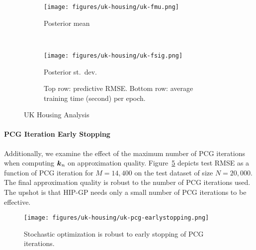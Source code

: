 \begin{figure}
\centering
\begin{subfigure}{.48\columnwidth}
  \texttt{[image: figures/uk-housing/uk-fmu.png]}
  \caption{Posterior mean}
	\label{fig:housing-mu}
\end{subfigure}
~
\begin{subfigure}{.48\columnwidth}
  \texttt{[image: figures/uk-housing/uk-fsig.png]}
  \caption{Posterior st.~dev.}
  \label{fig:housing-sig}
\end{subfigure}

%  

\begin{subfigure}{\columnwidth}
  \centering
  \scalebox{.7}{
  
  }
	\caption{Top row: predictive RMSE. Bottom row: average training time (second) per epoch.}
	\label{tab:housing-table}
\end{subfigure}
\caption{UK Housing Analysis}
\label{fig:uk-housing}
\end{figure}

\paragraph{PCG Iteration Early Stopping}
Additionally, we examine the effect of the maximum number of PCG iterations
when computing $\boldsymbol{k}_n$ on approximation
quality.  Figure~\ref{fig:pcg-iter} depicts test
RMSE as a function of PCG iteration for $M = 14{,}400$
on the test dataset of size $N=20{,}000$.
The final approximation quality is robust to the number of PCG iterations used.
The upshot is that HIP-GP needs only a small number of PCG iterations
to be effective. %

\begin{figure}[t!]
  \centering
  \texttt{[image: figures/uk-housing/uk-pcg-earlystopping.png]}
  \caption{Stochastic optimization is robust to early stopping
     of PCG iterations.
  }
  \label{fig:pcg-iter}
\end{figure}

